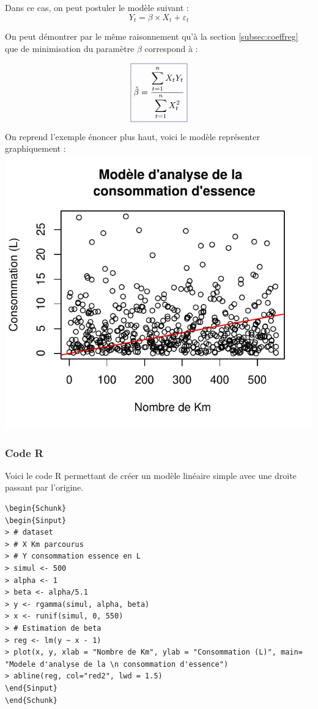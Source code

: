 \documentclass[11pt,french]{report}
\begin{document}
Dans ce cas, on peut postuler le modèle suivant :
\begin{equation}
\label{eq:regzero}
Y_t = \beta \times X_t + \varepsilon_t
\end{equation}

On peut démontrer par le même raisonnement qu'à la section \ref{subsec:coeffreg} que de minimisation du paramètre $\beta$ correspond à :

\begin{equation}
\label{eq:betasimp}
\color{Blue}
\boxed{\color{black}
\hat{\beta} = \frac{\displaystyle\sum_{t=1}^n X_t Y_t}{\displaystyle\sum_{t=1}^n X_t^2}}
\end{equation}

On reprend l'exemple énoncer plus haut, voici le modèle représenter graphiquement :
\includegraphics{notes_de_cours-009}

\subsubsection*{Code R}
Voici le code R permettant de créer un modèle linéaire simple avec une droite passant par l'origine.

\begin{lstlisting}[linerange=\\begin\{Sinput\}-\\end\{Sinput\},includerangemarker=false, caption = Code source en R pour l'exemple]
\begin{Schunk}
\begin{Sinput}
> # dataset
> # X Km parcourus
> # Y consommation essence en L
> simul <- 500
> alpha <- 1
> beta <- alpha/5.1
> y <- rgamma(simul, alpha, beta)
> x <- runif(simul, 0, 550)
> # Estimation de beta
> reg <- lm(y ~ x - 1)
> plot(x, y, xlab = "Nombre de Km", ylab = "Consommation (L)", main= "Modele d'analyse de la \n consommation d'essence")
> abline(reg, col="red2", lwd = 1.5)
\end{Sinput}
\end{Schunk}
\end{lstlisting}
\bigskip
\end{document}
